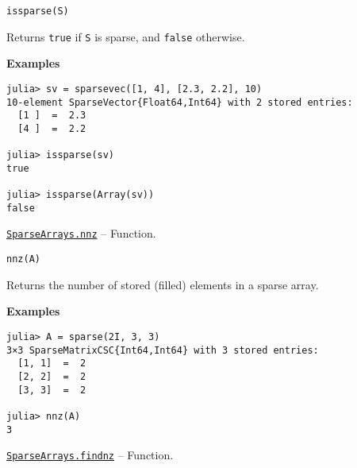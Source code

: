 \begin{adjustwidth}{2em}{0pt}


\begin{verbatim}
issparse(S)
\end{verbatim}

Returns \texttt{true} if \texttt{S} is sparse, and \texttt{false} otherwise.

\textbf{Examples}


\begin{verbatim}
julia> sv = sparsevec([1, 4], [2.3, 2.2], 10)
10-element SparseVector{Float64,Int64} with 2 stored entries:
  [1 ]  =  2.3
  [4 ]  =  2.2

julia> issparse(sv)
true

julia> issparse(Array(sv))
false
\end{verbatim}



\end{adjustwidth}
\hypertarget{4231069364201374387}{} 
\hyperlink{4231069364201374387}{\texttt{SparseArrays.nnz}}  -- {Function.}

\begin{adjustwidth}{2em}{0pt}


\begin{verbatim}
nnz(A)
\end{verbatim}

Returns the number of stored (filled) elements in a sparse array.

\textbf{Examples}


\begin{verbatim}
julia> A = sparse(2I, 3, 3)
3×3 SparseMatrixCSC{Int64,Int64} with 3 stored entries:
  [1, 1]  =  2
  [2, 2]  =  2
  [3, 3]  =  2

julia> nnz(A)
3
\end{verbatim}



\end{adjustwidth}
\hypertarget{15430174447643444721}{} 
\hyperlink{15430174447643444721}{\texttt{SparseArrays.findnz}}  -- {Function.}

